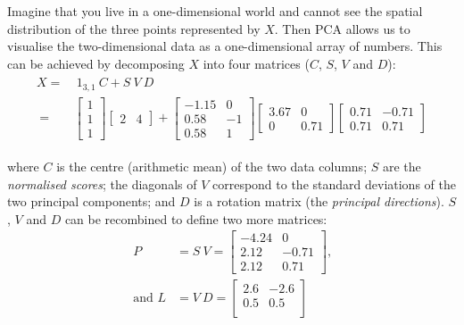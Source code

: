 Imagine that you live in a one-dimensional world and cannot see the
spatial distribution of the three points represented by $X$. Then PCA
allows us to visualise the two-dimensional data as a one-dimensional
array of numbers. This can be achieved by decomposing $X$ into four
matrices ($C$, $S$, $V$ and $D$):
\begin{align}
  \begin{split}
    X = & ~ 1_{3,1}~C + S~V~D\\
    ~ = &  \left[
      \begin{array}{c}
        1 \\
        1 \\
        1
      \end{array}
      \right]
    \left[
      \begin{array}{cc}
        2 & 4
      \end{array}
      \right]
    +
    \left[
      \begin{array}{cc}
        -1.15 & 0 \\
        0.58 & -1 \\
        0.58 & 1
      \end{array}
      \right]
    \left[
      \begin{array}{cc}
        3.67 & 0 \\
        0 & 0.71
      \end{array}
      \right]
    \left[
      \begin{array}{cc}
        0.71 & -0.71\\
        0.71 & 0.71
      \end{array}
      \right]
    \label{eq:PCA}
  \end{split}
\end{align}

\noindent where $C$ is the centre (arithmetic mean) of the two data
columns; $S$ are the \emph{normalised scores}; the diagonals of $V$
correspond to the standard deviations of the two principal components;
and $D$ is a rotation matrix (the \emph{principal directions}). $S$,
$V$ and $D$ can be recombined to define two more matrices:
\begin{align}
  P & = S~V =
  \left[
    \begin{array}{cc}
      -4.24 & 0 \\
      2.12 & -0.71 \\
      2.12 & 0.71
    \end{array}
    \right] \mbox{,}\label{eq:P} \\
  \mbox{and~} L & = V~D  =
  \left[
    \begin{array}{cc}
      2.6 & -2.6 \\
      0.5 & 0.5 \\
    \end{array}
    \right]
  \label{eq:L}
\end{align}

